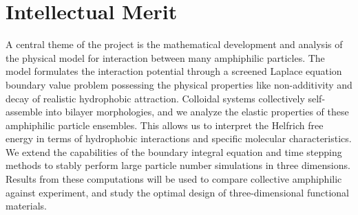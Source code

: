 \section{Intellectual Merit}
A central theme of the project is the mathematical development and
analysis of the physical model for interaction between many amphiphilic
particles. The model formulates the interaction potential through a
screened Laplace equation boundary value problem possessing the physical
properties like non-additivity and decay of realistic hydrophobic
attraction. Colloidal systems collectively self-assemble into bilayer
morphologies, and we analyze the elastic properties of these amphiphilic
particle ensembles. This allows us to interpret the Helfrich free energy
in terms of hydrophobic interactions and specific molecular
characteristics. We extend the capabilities of the boundary integral
equation and time stepping methods to stably perform large particle
number simulations in three dimensions. Results from these computations
will be used to compare collective amphiphilic against experiment, and
study the optimal design of three-dimensional functional materials. 



